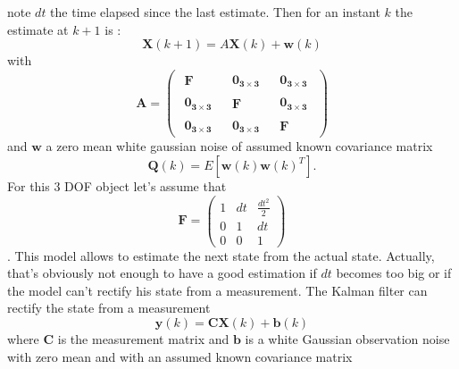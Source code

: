 \documentclass{vldb}
\begin{document}
note $dt$ the time elapsed since the last estimate. Then for an instant $k$ the estimate at $k+1$ is : 
\begin{equation}
\mathbf{X}(k+1) = A \mathbf{X}(k) +  \mathbf{w}(k)
\end{equation}
with $$\mathbf{A}=
\begin{pmatrix}
\begin{matrix}
\mathbf{F}
\end{matrix} &
\begin{matrix}
\mathbf{0_{3 \times 3}}
\end{matrix} &
\begin{matrix}
\mathbf{0_{3 \times 3}}
\end{matrix} \\
\begin{matrix}
\mathbf{0_{3 \times 3}}
\end{matrix} &
\begin{matrix}
\mathbf{F}
\end{matrix} &
\begin{matrix}
\mathbf{0_{3 \times 3}}
\end{matrix} \\
\begin{matrix}
\mathbf{0_{3 \times 3}}
\end{matrix} &
\begin{matrix}
\mathbf{0_{3 \times 3}}
\end{matrix} &
\begin{matrix}
\mathbf{F}
\end{matrix}
\end{pmatrix}$$
and $\mathbf{w}$ a zero mean white gaussian noise of assumed known covariance matrix $$ \mathbf{Q}(k) = E[ \mathbf{w}(k) \mathbf{w}(k)^T].$$ For  this 3 DOF object let's assume that $$\mathbf{F}=
\begin{pmatrix}
1 & dt & \frac{dt^2}{2} \\
0 & 1 & dt \\
0 & 0 & 1
\end{pmatrix}$$.  This model allows to estimate the next state from the actual state. Actually, that's obviously not enough to have a good estimation if $dt$ becomes too big or if the model can't rectify his state from a measurement. The Kalman filter can rectify the state from a measurement 
\begin{equation}
\mathbf{y}(k) = \mathbf{C} \mathbf{X}(k) + \mathbf{b}(k)
\end{equation} where $ \mathbf{C}$ is the measurement matrix and $\mathbf{b}$ is a white Gaussian observation noise with zero mean and with an assumed known covariance matrix
\end{document}
